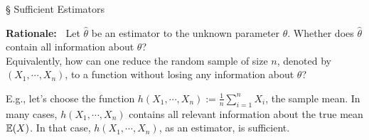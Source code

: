 \begin{frame}{\S{} Sufficient Estimators}

 {\bf Rationale:~} Let $\widehat{\theta}$ be an estimator to the unknown parameter $\theta$. Whether does $\widehat{\theta}$ contain all information about $\theta$? \\[1em] \pause
 Equivalently, how can one reduce the random sample of size $n$, denoted by $(X_1,\cdots, X_n)$, to a function without losing any information about $\theta$?

 \vfill
 \pause

 E.g., let's choose the function $h(X_1,\cdots,X_n):= \frac{1}{n}\sum_{i=1}^n X_i$, the sample mean. In many cases, $h(X_1,\cdots,X_n)$ contains all relevant information about the true mean $\mathbb{E}(X)$. In that case, $h(X_1,\cdots,X_n)$, as an estimator, is sufficient.

 \end{frame}

